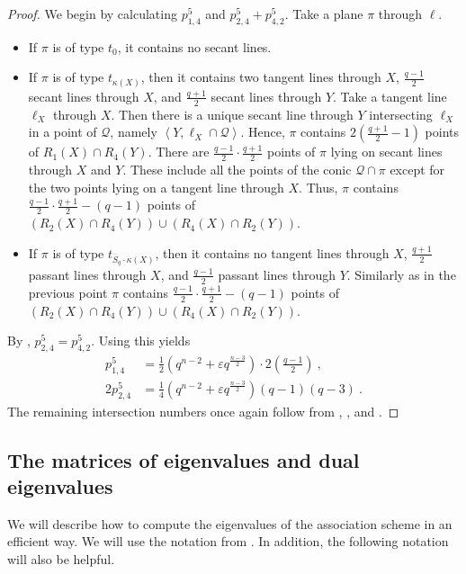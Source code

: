 \documentclass[a4paper]{article}
\theoremstyle{definition}
\newcommand{\eps}{\varepsilon}
\newcommand{\vspan}[1]{\left \langle #1 \right \rangle}
\newcommand{\mq}{\mathcal Q}
\newcommand{\ns}{\overline S}
\begin{document}
\begin{proof}
 We begin by calculating $p^5_{1,4}$ and $p^5_{2,4} + p^5_{4,2}$.
 Take a plane $\pi$ through $\ell$.
 \begin{itemize}
  \item If $\pi$ is of type $t_0$, it contains no secant lines.
  \item If $\pi$ is of type $t_{\kappa(X)}$, then it contains two tangent lines through $X$, $\frac{q-1}2$ secant lines through $X$, and $\frac{q+1}2$ secant lines through $Y$.
  Take a tangent line $\ell_X$ through $X$.
  Then there is a unique secant line through $Y$ intersecting $\ell_X$ in a point of $\mq$, namely $\vspan{Y, \ell_X \cap \mq}$.
  Hence, $\pi$ contains $2\left( \frac{q+1}2 - 1 \right)$ points of $R_1(X) \cap R_4(Y)$.
  There are $\frac{q-1}2\cdot \frac{q+1}2$ points of $\pi$ lying on secant lines through $X$ and $Y$.
  These include all the points of the conic $\mq \cap \pi$ except for the two points lying on a tangent line through $X$.
  Thus, $\pi$ contains $\frac{q-1}2 \cdot\frac{q+1}2 - (q-1)$ points of $(R_2(X) \cap R_4(Y)) \cup (R_4(X) \cap R_2(Y))$.
  \item If $\pi$ is of type $t_{\ns_q \cdot \kappa(X)}$, then it contains no tangent lines through $X$, $\frac{q+1}2$ passant lines through $X$, and $\frac{q-1}2$ passant lines through $Y$.
  Similarly as in the previous point $\pi$ contains $\frac{q-1}2 \cdot\frac{q+1}2 - (q-1)$ points of $(R_2(X) \cap R_4(Y)) \cup (R_4(X) \cap R_2(Y))$.
 \end{itemize}
 By , $p^5_{2,4} = p^5_{4,2}$.
 Using  this yields
 \begin{align*}
  p^{5}_{1,4} &= \frac{1}{2} \left( q^{n-2} + \eps q^{\frac{n-3}{2}} \right) \cdot 2 \left( \frac{q-1}{2} \right) \:, \\
  2p^{5}_{2,4} &= \frac{1}{4} \left( q^{n-2}+\eps q^{\frac{n-3}{2}} \right) (q-1) (q-3) \: .
 \end{align*}
 The remaining intersection numbers once again follow from , , and .
\end{proof}


\subsection{The matrices of eigenvalues and dual eigenvalues}\label{SecPQmatrix}

We will describe how to compute the eigenvalues of the association scheme in an efficient way.
We will use the notation from .
In addition, the following notation will also be helpful.
\end{document}
